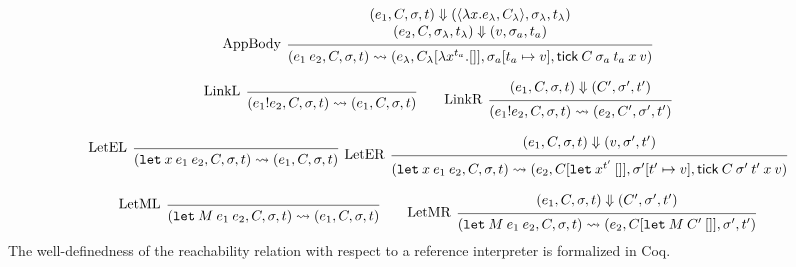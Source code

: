 \documentclass{article}
\theoremstyle{definition}
\newcommand*{\link}[2]{{#1}\mathtt{!}{#2}}
\newcommand*{\tick}{\mathsf{tick}}
\begin{document}
\[
  \begin{prooftree}
    \hypo{
      \begin{matrix}
        (e_{1}, C, \sigma, t)
        \Downarrow
        (\langle\lambda x.e_{\lambda}, C_{\lambda}\rangle, \sigma_{\lambda}, t_{\lambda}) \\
        (e_{2}, C, \sigma_{\lambda}, t_{\lambda})
        \Downarrow
        (v, \sigma_{a}, t_{a})
      \end{matrix}
    }
    \infer[left label={AppBody}]1{
    (e_{1}\:e_{2}, C, \sigma, t)
    \rightsquigarrow
    (e_{\lambda}, C_{\lambda}[\lambda x^{t_{a}}.[]], \sigma_{a}[t_{a}\mapsto v], \tick\:C\:\sigma_{a}\:t_{a}\:x\:v)
    }
  \end{prooftree}
\]

\[
  \begin{prooftree}
    \infer[left label=LinkL]0{
    (\link{e_{1}}{e_{2}}, C, \sigma, t)
    \rightsquigarrow
    (e_{1}, C, \sigma, t)
    }
  \end{prooftree}\qquad
  \begin{prooftree}
    \hypo{
      \begin{matrix}
        (e_{1}, C, \sigma, t)
        \Downarrow
        (C', \sigma', t')
      \end{matrix}
    }
    \infer[left label=LinkR]1{
    (\link{e_{1}}{e_{2}}, C, \sigma, t)
    \rightsquigarrow
    (e_{2}, C', \sigma', t')
    }
  \end{prooftree}
\]

\[
  \begin{prooftree}
    \infer[left label=LetEL]0{
    (\mathtt{let}\:x\:e_1\:e_2, C, \sigma, t)
    \rightsquigarrow
    (e_{1}, C, \sigma, t)
    }
  \end{prooftree}\:\:
  \begin{prooftree}
    \hypo{
      \begin{matrix}
        (e_{1}, C, \sigma, t)
        \Downarrow
        (v, \sigma', t')
      \end{matrix}
    }
    \infer[left label=LetER]1{
    (\mathtt{let}\:x\:e_1\:e_2, C, \sigma, t)
    \rightsquigarrow
    (e_{2}, C[\mathtt{let}\:x^{t'}\:[]], \sigma'[t'\mapsto v], \tick\:C\:\sigma'\:t'\:x\:v)
    }
  \end{prooftree}
\]

\[
  \begin{prooftree}
    \infer[left label=LetML]0{
    (\mathtt{let}\:M\:e_{1}\:e_{2}, C, \sigma, t)
    \rightsquigarrow
    (e_{1}, C, \sigma, t)
    }
  \end{prooftree}\qquad
  \begin{prooftree}
    \hypo{
      \begin{matrix}
        (e_{1}, C, \sigma, t)
        \Downarrow
        (C', \sigma', t')
      \end{matrix}
    }
    \infer[left label=LetMR]1{
    (\mathtt{let}\:M\:e_{1}\:e_{2}, C, \sigma, t)
    \rightsquigarrow
    (e_{2}, C[\mathtt{let}\:M\:C'\:[]], \sigma', t')
    }
  \end{prooftree}
\]
The well-definedness of the reachability relation with respect to a reference interpreter is formalized in Coq.
\end{document}
